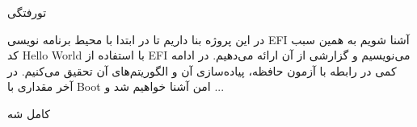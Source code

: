 





‌تورفتگی

در این پروژه بنا داریم تا در ابتدا با محیط برنامه نویسی EFI آشنا شویم به همین سبب کد Hello World با استفاده از EFI می‌نویسیم و گزارشی از آن ارائه می‌دهیم. در ادامه کمی در رابطه با آزمون حافظه، پیاده‌سازی آن و الگوریتم‌های آن تحقیق می‌کنیم. در آخر مقداری با Boot امن آشنا خواهیم شد و ...


کامل شه
